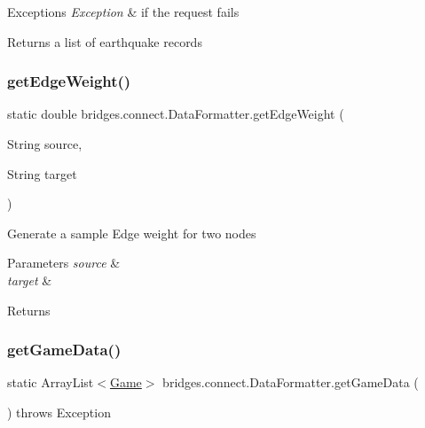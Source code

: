 \begin{DoxyExceptions}{Exceptions}
{\em Exception} & if the request fails\\
\hline
\end{DoxyExceptions}
\begin{DoxyReturn}{Returns}
a list of earthquake records 
\end{DoxyReturn}
\mbox{\label{classbridges_1_1connect_1_1_data_formatter_a2637c733e7f4efccfb56de0940506318}} 
\subsubsection{\texorpdfstring{get\+Edge\+Weight()}{getEdgeWeight()}}
{\footnotesize\ttfamily static double bridges.\+connect.\+Data\+Formatter.\+get\+Edge\+Weight (\begin{DoxyParamCaption}\item[{String}]{source,  }\item[{String}]{target }\end{DoxyParamCaption})\hspace{0.3cm}{\ttfamily [static]}}

Generate a sample Edge weight for two nodes 
\begin{DoxyParams}{Parameters}
{\em source} & \\
\hline
{\em target} & \\
\hline
\end{DoxyParams}
\begin{DoxyReturn}{Returns}

\end{DoxyReturn}
\mbox{\label{classbridges_1_1connect_1_1_data_formatter_a4098317468be22b4284156d6cd2212e1}} 
\subsubsection{\texorpdfstring{get\+Game\+Data()}{getGameData()}}
{\footnotesize\ttfamily static Array\+List$<$\mbox{\hyperlink{classbridges_1_1data__src__dependent_1_1_game}{Game}}$>$ bridges.\+connect.\+Data\+Formatter.\+get\+Game\+Data (\begin{DoxyParamCaption}{ }\end{DoxyParamCaption}) throws Exception\hspace{0.3cm}{\ttfamily [static]}}

